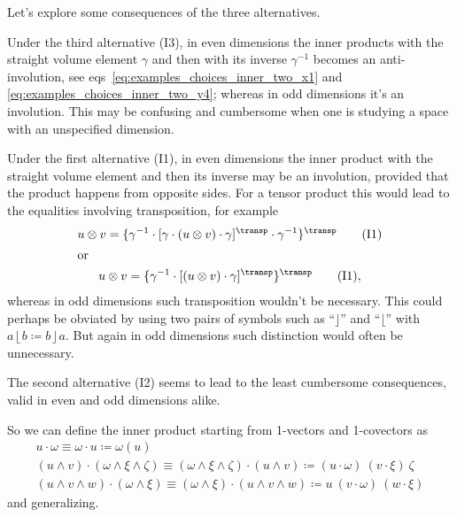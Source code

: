 \documentclass[\ifafour a4paper,12pt,\else a5paper,10pt,\fi%
onecolumn,oneside,article,%
british%
]{memoir}
\theoremstyle{remark}
\theoremstyle{innote}
\newcommand*{\defd}{\coloneqq}
\renewcommand*{\|}[1][]{\nonscript\,#1\vert\nonscript\;\mathopen{}}
\newcommand*{\eqns}{eqs}%
\newcommand*{\T}{^\transp}%
\newcommand*{\ii}{\mathbin{\rfloor}}
\newcommand*{\rii}{\mathbin{\lfloor}}
\begin{document}
Let's explore some consequences of the three alternatives.

Under the third alternative (I3), in even dimensions the inner products
with the straight volume element $\gamma$ and then with its inverse
$\gamma^{-1}$ becomes an anti-involution, see
\eqns~\eqref{eq:examples_choices_inner_two_x1} and
\eqref{eq:examples_choices_inner_two_y4}; whereas in odd dimensions it's an
involution. This may be confusing and cumbersome when one is studying a
space with an unspecified dimension.

Under the first alternative (I1), in even dimensions the inner product with
the straight volume element and then its inverse may be an involution,
provided that the product happens from opposite sides. For a tensor product
this would lead to the equalities involving transposition, for example
\begin{gather}
  \label{eq:example_invol_transp}
  u \otimes v =
  \{ \gamma^{-1} \cdot
  [\gamma \cdot (u \otimes v) \cdot \gamma]\T
  \cdot \gamma^{-1} \}\T
  \qquad\text{(I1)}
  \\\shortintertext{or}
  u \otimes v =
  \{ \gamma^{-1} \cdot
  [(u \otimes v) \cdot \gamma]\T 
\}\T  \qquad\text{(I1)},
\end{gather}
whereas in odd dimensions such transposition wouldn't be necessary. This
could perhaps be obviated by using two pairs of symbols such as
\enquote{$\ii$} and \enquote{$\rii$} with $a \rii b \defd b \ii a$. But
again in odd dimensions such distinction would often be unnecessary.

The second alternative (I2) seems to lead to the least cumbersome
consequences, valid in even and odd dimensions alike.

So we can define the inner product starting from 1-vectors and 1-covectors as
\begin{equation}
  \label{eq:inner_prod_final_def}
  \begin{gathered}
    u \cdot \omega \equiv \omega \cdot u \defd \omega(u)
    \\
    (u \land v) \cdot (\omega \land \xi \land \zeta) \equiv
    (\omega \land \xi \land \zeta) \cdot (u \land v)
    \defd (u \cdot \omega)\ (v \cdot \xi)\ \zeta
    \\
    (u \land v \land w) \cdot (\omega \land \xi) \equiv
    (\omega \land \xi) \cdot (u \land v \land w)
    \defd u\ (v \cdot \omega)\ (w \cdot \xi)
\end{gathered}
\end{equation}
and generalizing.
\end{document}
